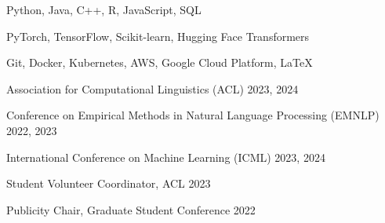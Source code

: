 \documentclass{academic-cv}
\begin{document}

Python, Java, C++, R, JavaScript, SQL

PyTorch, TensorFlow, Scikit-learn, Hugging Face Transformers

Git, Docker, Kubernetes, AWS, Google Cloud Platform, LaTeX


\begin{cvlist}
    \item Association for Computational Linguistics (ACL) 2023, 2024
    \item Conference on Empirical Methods in Natural Language Processing (EMNLP) 2022, 2023
    \item International Conference on Machine Learning (ICML) 2023, 2024
\end{cvlist}

\begin{cvlist}
    \item Student Volunteer Coordinator, ACL 2023
    \item Publicity Chair, Graduate Student Conference 2022
\end{cvlist}
\end{document}
